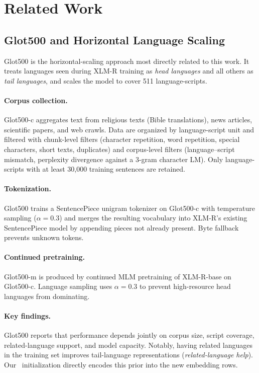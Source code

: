 \section{Related Work}

\subsection{Glot500 and Horizontal Language Scaling}

Glot500 \citep{imani2023glot500} is the horizontal-scaling approach most directly related to
this work.
It treats languages seen during XLM-R training as \emph{head languages} and all others as
\emph{tail languages}, and scales the model to cover 511 language-scripts.

\paragraph{Corpus collection.}
Glot500-c aggregates text from religious texts (Bible translations), news articles, scientific
papers, and web crawls.
Data are organized by language-script unit and filtered with chunk-level filters
(character repetition, word repetition, special characters, short texts, duplicates)
and corpus-level filters (language--script mismatch, perplexity divergence against a 3-gram
character LM).
Only language-scripts with at least 30,000 training sentences are retained.

\paragraph{Tokenization.}
Glot500 trains a SentencePiece unigram tokenizer \citep{kudo2018unigram,kudo2018sentencepiece}
on Glot500-c with temperature sampling ($\alpha=0.3$) and merges the resulting vocabulary
into XLM-R's existing SentencePiece model by appending pieces not already present.
Byte fallback prevents unknown tokens.

\paragraph{Continued pretraining.}
Glot500-m is produced by continued MLM pretraining of XLM-R-base on Glot500-c.
Language sampling uses $\alpha=0.3$ to prevent high-resource head languages from dominating.

\paragraph{Key findings.}
Glot500 reports that performance depends jointly on corpus size, script coverage, related-language
support, and model capacity.
Notably, having related languages in the training set improves tail-language representations
(\emph{related-language help}).
Our \famm\ initialization directly encodes this prior into the new embedding rows.

